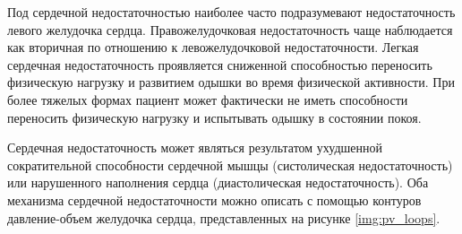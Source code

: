 Под сердечной недостаточностью наиболее часто подразумевают недостаточность левого желудочка сердца. Правожелудочковая недостаточность чаще наблюдается как вторичная по отношению к левожелудочковой недостаточности. Легкая сердечная недостаточность проявляется сниженной способностью переносить физическую нагрузку и развитием одышки во время физической активности. При более тяжелых формах пациент может фактически не иметь способности переносить физическую нагрузку и испытывать одышку в состоянии покоя. 
% 
% 

Сердечная недостаточность может являться результатом ухудшенной сократительной способности сердечной мышцы (систолическая недостаточность) или нарушенного наполнения сердца (диастолическая недостаточность). Оба механизма сердечной недостаточности можно описать с помощью контуров давление-объем желудочка сердца, представленных на рисунке \ref{img:pv_loops}. 


